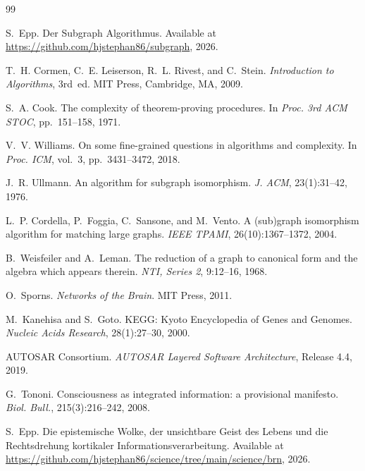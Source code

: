 ﻿\documentclass[12pt,a4paper]{article}
\theoremstyle{plain}
\theoremstyle{definition}
\theoremstyle{remark}
\begin{document}
	\begin{thebibliography}{99}
		
		S.~Epp.
		Der Subgraph Algorithmus. Available at \url{https://github.com/hjstephan86/subgraph}, 2026.
		
		T.~H. Cormen, C.~E. Leiserson, R.~L. Rivest, and C.~Stein.
		\textit{Introduction to Algorithms}, 3rd~ed.
		MIT Press, Cambridge, MA, 2009.
		
		S.~A. Cook.
		The complexity of theorem-proving procedures.
		In \textit{Proc. 3rd ACM STOC}, pp.~151--158, 1971.
		
		V.~V. Williams.
		On some fine-grained questions in algorithms and complexity.
		In \textit{Proc. ICM}, vol.~3, pp.~3431--3472, 2018.
		
		J.~R. Ullmann.
		An algorithm for subgraph isomorphism.
		\textit{J. ACM}, 23(1):31--42, 1976.
		
		L.~P. Cordella, P.~Foggia, C.~Sansone, and M.~Vento.
		A (sub)graph isomorphism algorithm for matching large graphs.
		\textit{IEEE TPAMI}, 26(10):1367--1372, 2004.
		
		B.~Weisfeiler and A.~Leman.
		The reduction of a graph to canonical form and the algebra which appears therein.
		\textit{NTI, Series 2}, 9:12--16, 1968.
		
		O.~Sporns.
		\textit{Networks of the Brain}.
		MIT Press, 2011.
		
		M.~Kanehisa and S.~Goto.
		KEGG: Kyoto Encyclopedia of Genes and Genomes.
		\textit{Nucleic Acids Research}, 28(1):27--30, 2000.
		
		AUTOSAR Consortium.
		\textit{AUTOSAR Layered Software Architecture}, Release 4.4, 2019.
		
		G.~Tononi.
		Consciousness as integrated information: a provisional manifesto.
		\textit{Biol. Bull.}, 215(3):216--242, 2008.
		
		S.~Epp.
		Die epistemische Wolke, der unsichtbare Geist des Lebens und die
		Rechtsdrehung kortikaler Informationsverarbeitung.
		Available at \url{https://github.com/hjstephan86/science/tree/main/science/brn}, 2026.
		

\end{thebibliography}
\end{document}
